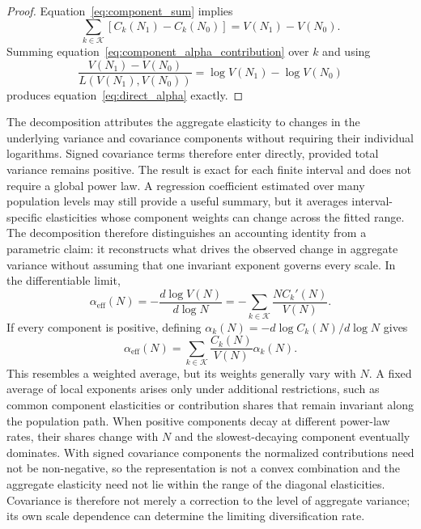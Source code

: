 \documentclass[preprint,12pt,authoryear]{elsarticle}
\begin{document}
\begin{proof}
Equation~\eqref{eq:component_sum} implies
\begin{equation}
    \sum_{k\in\mathcal{K}}
    \left[C_k(N_1)-C_k(N_0)\right]
    =V(N_1)-V(N_0).
\end{equation}
Summing equation~\eqref{eq:component_alpha_contribution} over $k$ and
using
\begin{equation}
    \frac{V(N_1)-V(N_0)}{L(V(N_1),V(N_0))}
    =\log V(N_1)-\log V(N_0)
\end{equation}
produces equation~\eqref{eq:direct_alpha} exactly.
\end{proof}

The decomposition attributes the aggregate elasticity to changes in the
underlying variance and covariance components without requiring their
individual logarithms. Signed covariance terms therefore enter directly,
provided total variance remains positive. The result is exact for each
finite interval and does not require a global power law. A regression
coefficient estimated over many population levels may still provide a
useful summary, but it averages interval-specific elasticities whose
component weights can change across the fitted range. The decomposition
therefore distinguishes an accounting identity from a parametric claim:
it reconstructs what drives the observed change in aggregate variance
without assuming that one invariant exponent governs every scale. In the
differentiable limit,
\begin{equation}
\label{eq:local_signed_decomposition}
    \alpha_{\mathrm{eff}}(N)
    =-
    \frac{d\log V(N)}{d\log N}
    =-
    \sum_{k\in\mathcal{K}}
    \frac{N C_k'(N)}{V(N)}.
\end{equation}
If every component is positive, defining
$\alpha_k(N)=-d\log C_k(N)/d\log N$ gives
\begin{equation}
\label{eq:weighted_local_alpha}
    \alpha_{\mathrm{eff}}(N)
    =
    \sum_{k\in\mathcal{K}}
    \frac{C_k(N)}{V(N)}\alpha_k(N).
\end{equation}
This resembles a weighted average, but its weights generally vary with
$N$. A fixed average of local exponents arises only under additional
restrictions, such as common component elasticities or contribution
shares that remain invariant along the population path. When positive
components decay at different power-law rates, their shares change with
$N$ and the slowest-decaying component eventually dominates. With signed
covariance components the normalized contributions need not be
non-negative, so the representation is not a convex combination and the
aggregate elasticity need not lie within the range of the diagonal
elasticities. Covariance is therefore not merely a correction to the
level of aggregate variance; its own scale dependence can determine the
limiting diversification rate.
\end{document}
